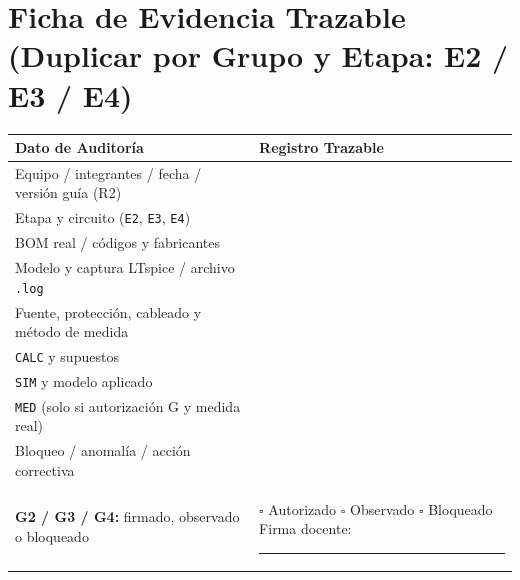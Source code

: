\documentclass[10pt, a4paper, landscape]{article}
\begin{document}
\newpage
\section*{Ficha de Evidencia Trazable (Duplicar por Grupo y Etapa: E2 / E3 / E4)}


\par\vspace{0.15cm}
{\small
\renewcommand{\arraystretch}{1.85}%
\noindent\begin{tabularx}{\linewidth}{|>{\raggedright\arraybackslash}p{7.4cm}|>{\raggedright\arraybackslash}X|}
\hline
\rowcolor{ucbgray}
\textbf{Dato de Auditoría} & \textbf{Registro Trazable} \\ \hline
Equipo / integrantes / fecha / versión guía (R2) & \\ \hline
Etapa y circuito (\texttt{E2}, \texttt{E3}, \texttt{E4}) & \\ \hline
BOM real / códigos y fabricantes & \\ \hline
Modelo y captura LTspice / archivo \texttt{.log} & \\ \hline
Fuente, protección, cableado y método de medida & \\ \hline
\texttt{CALC} y supuestos & \\ \hline
\texttt{SIM} y modelo aplicado & \\ \hline
\texttt{MED} (solo si autorización G y medida real) & \\ \hline
Bloqueo / anomalía / acción correctiva & \\ \hline
\textbf{G2 / G3 / G4:} firmado, observado o bloqueado & $\square$ Autorizado \quad $\square$ Observado \quad $\square$ Bloqueado \hfill Firma docente: \rule{5.2cm}{0.4pt} \\ \hline
\end{tabularx}\par}
\end{document}
